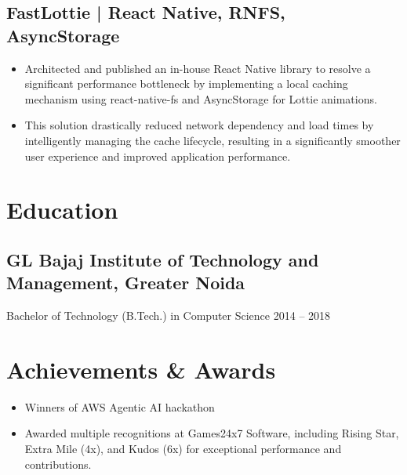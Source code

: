 \documentclass[11pt,a4paper]{article}
\begin{document}
\subsection{FastLottie | React Native, RNFS, AsyncStorage}
\begin{itemize}
    \item Architected and published an in-house React Native library to resolve a significant performance bottleneck by implementing a local caching mechanism using react-native-fs and AsyncStorage for Lottie animations.
    \item This solution drastically reduced network dependency and load times by intelligently managing the cache lifecycle, resulting in a significantly smoother user experience and improved application performance.
\end{itemize}






\section{Education}
\subsection{GL Bajaj Institute of Technology and Management, Greater Noida}
Bachelor of Technology (B.Tech.) in Computer Science \hfill 2014 – 2018
\section{Achievements \& Awards}
\begin{itemize}
    \item Winners of AWS Agentic AI hackathon
    \item Awarded multiple recognitions at Games24x7 Software, including Rising Star, Extra Mile (4x), and Kudos (6x) for exceptional performance and contributions.
\end{itemize}
\end{document}
